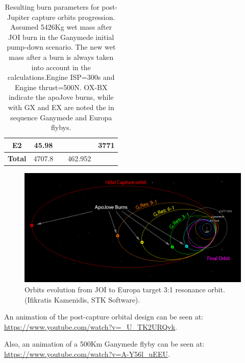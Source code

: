 \begin{table}[htb!]
\begin{tabular}{|r|r|r|r|r|}
    \hline
    \multicolumn{1}{|c|}{\textbf{E2}} & \multicolumn{1}{c|}{45.98} &       & \multicolumn{1}{c|}{} & \multicolumn{1}{c|}{3771} \bigstrut\\
    \hline
    \multicolumn{1}{|c|}{\textbf{Total }} & \multicolumn{1}{c|}{4707.8} &       & \multicolumn{1}{c|}{462.952} & \multicolumn{1}{c|}{} \bigstrut\\
    \hline
    \end{tabular}%
    \caption{Resulting burn parameters for post-Jupiter capture orbits progression. Assumed 5426Kg wet mass after JOI burn in the Ganymede initial pump-down scenario. The new wet mass after a burn is always taken into account in the calculations.Engine ISP=300s and Engine thrust=500N. OX-BX indicate the apoJove burns, while with GX and EX are noted the in sequence Ganymede and Europa flybys.}
  \label{tab:boardm}%
\end{table}%

\begin{figure}[htb!]
\centering
\includegraphics[width=\textwidth]{figures/Orbiter/orbits.png}
\caption{Orbits evolution from JOI to Europa target 3:1 resonance orbit. (Ifikratis Kamenidis, STK Software).}\label{fig:orbits_resonance}
\end{figure}

An animation of the post-capture orbital design can be seen at:
\url{https://www.youtube.com/watch?v=_U_TK2URQvk}.

Also, an animation of a 500Km Ganymede flyby can be seen at:
\url{https://www.youtube.com/watch?v=A-Y56l_uEEU}.

